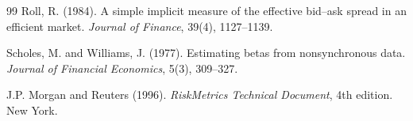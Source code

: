 \documentclass[11pt,a4paper]{article}
\begin{document}
\begin{thebibliography}{99}
Roll, R. (1984).
\newblock A simple implicit measure of the effective bid--ask spread in an
efficient market.
\newblock \emph{Journal of Finance}, 39(4), 1127--1139.

Scholes, M. and Williams, J. (1977).
\newblock Estimating betas from nonsynchronous data.
\newblock \emph{Journal of Financial Economics}, 5(3), 309--327.

J.P. Morgan and Reuters (1996).
\newblock \emph{RiskMetrics Technical Document}, 4th edition.
\newblock New York.

\end{thebibliography}
\end{document}
